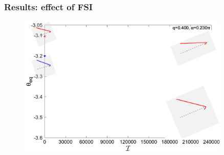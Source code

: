 \documentclass{beamer}
\begin{document}
\begin{frame}
	\frametitle{Results: effect of FSI}
	\begin{overlayarea}{\textwidth}{\textheight}
		\vspace{-0.3cm}  %
		\begin{figure}[htb]
		\begin{center}
			\includegraphics[width=0.9\textwidth]{plots/RESLT_q_0.40_alpha_0.230pi_plot_step_refine2_new_recale_FSI_slides/combine_elastic_beam_I_theta_q_0.40_alpha_0.230pi_initial_-4.80_refine2_new_not_log_0.png}
		\end{center}
	\end{figure}	
		\vspace{-0.3cm}  %
		

\end{overlayarea}
\end{frame}
\end{document}
